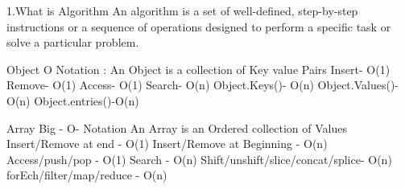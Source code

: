 1.What is Algorithm
An algorithm is a set of well-defined, step-by-step instructions or a sequence of 
operations designed to perform a specific task or solve a particular problem.

Object O Notation :
An Object is a collection of Key value Pairs
Insert- O(1)
Remove- O(1)
Access- O(1)
Search- O(n)
Object.Keys()- O(n)
Object.Values()- O(n)
Object.entries()-O(n)

Array Big - O- Notation
An Array is an Ordered collection of Values
Insert/Remove at end - O(1)
Insert/Remove at Beginning - O(n)
Access/push/pop - O(1)
Search - O(n)
Shift/unshift/slice/concat/splice- O(n)
forEch/filter/map/reduce - O(n)
